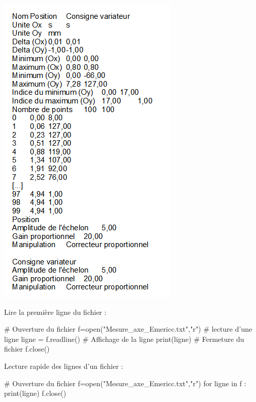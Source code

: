\documentclass[10pt,fleqn]{article} %
\begin{document}
\begin{exemple}
\begin{minipage}[c]{.36\linewidth}
\begin{center}
\includegraphics[width=.99\textwidth]{images/image11.png}
\end{center}
\end{minipage} \hfill
\begin{minipage}[c]{.6\linewidth}


\begin{py}
Lire la première ligne du fichier :
\begin{python}[h]
# Ouverture du fichier
f=open("Mesure_axe_Emericc.txt","r")
# lecture d'une ligne
ligne = f.readline()                  
# Affichage de la ligne
print(ligne)
# Fermeture du fichier
f.close()
\end{python}
Lecture rapide des lignes d'un fichier : 
\begin{python}[h]
# Ouverture du fichier
f=open("Mesure_axe_Emericc.txt","r")
for ligne in f :
    print(ligne)
f.close()
\end{python}
\end{py}


\end{minipage}
\end{exemple}
\end{document}
